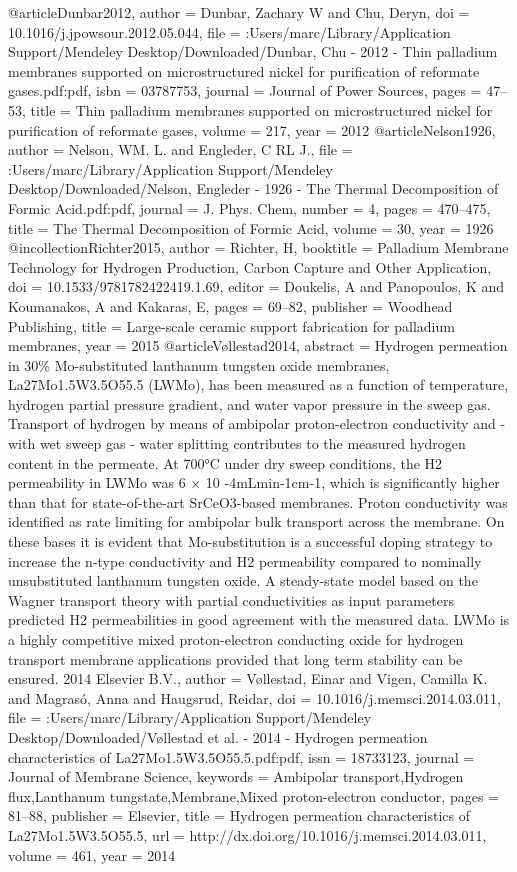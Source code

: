 @article{Dunbar2012,
author = {Dunbar, Zachary W and Chu, Deryn},
doi = {10.1016/j.jpowsour.2012.05.044},
file = {:Users/marc/Library/Application Support/Mendeley Desktop/Downloaded/Dunbar, Chu - 2012 - Thin palladium membranes supported on microstructured nickel for purification of reformate gases.pdf:pdf},
isbn = {03787753},
journal = {Journal of Power Sources},
pages = {47--53},
title = {{Thin palladium membranes supported on microstructured nickel for purification of reformate gases}},
volume = {217},
year = {2012}
}
@article{Nelson1926,
author = {Nelson, WM. L. and Engleder, C RL J.},
file = {:Users/marc/Library/Application Support/Mendeley Desktop/Downloaded/Nelson, Engleder - 1926 - The Thermal Decomposition of Formic Acid.pdf:pdf},
journal = {J. Phys. Chem},
number = {4},
pages = {470--475},
title = {{The Thermal Decomposition of Formic Acid}},
volume = {30},
year = {1926}
}
@incollection{Richter2015,
author = {Richter, H},
booktitle = {Palladium Membrane Technology for Hydrogen Production, Carbon Capture and Other Application},
doi = {10.1533/9781782422419.1.69},
editor = {Doukelis, A and Panopoulos, K and Koumanakos, A and Kakaras, E},
pages = {69--82},
publisher = {Woodhead Publishing},
title = {{Large-scale ceramic support fabrication for palladium membranes}},
year = {2015}
}
@article{Vøllestad2014,
abstract = {Hydrogen permeation in 30{\%} Mo-substituted lanthanum tungsten oxide membranes, La27Mo1.5W3.5O55.5 (LWMo), has been measured as a function of temperature, hydrogen partial pressure gradient, and water vapor pressure in the sweep gas. Transport of hydrogen by means of ambipolar proton-electron conductivity and - with wet sweep gas - water splitting contributes to the measured hydrogen content in the permeate. At 700°C under dry sweep conditions, the H2 permeability in LWMo was 6 × 10 -4mLmin-1cm-1, which is significantly higher than that for state-of-the-art SrCeO3-based membranes. Proton conductivity was identified as rate limiting for ambipolar bulk transport across the membrane. On these bases it is evident that Mo-substitution is a successful doping strategy to increase the n-type conductivity and H2 permeability compared to nominally unsubstituted lanthanum tungsten oxide. A steady-state model based on the Wagner transport theory with partial conductivities as input parameters predicted H2 permeabilities in good agreement with the measured data. LWMo is a highly competitive mixed proton-electron conducting oxide for hydrogen transport membrane applications provided that long term stability can be ensured. {\textcopyright} 2014 Elsevier B.V.},
author = {V{\o}llestad, Einar and Vigen, Camilla K. and Magras{\'{o}}, Anna and Haugsrud, Reidar},
doi = {10.1016/j.memsci.2014.03.011},
file = {:Users/marc/Library/Application Support/Mendeley Desktop/Downloaded/V{\o}llestad et al. - 2014 - Hydrogen permeation characteristics of La27Mo1.5W3.5O55.5.pdf:pdf},
issn = {18733123},
journal = {Journal of Membrane Science},
keywords = {Ambipolar transport,Hydrogen flux,Lanthanum tungstate,Membrane,Mixed proton-electron conductor},
pages = {81--88},
publisher = {Elsevier},
title = {{Hydrogen permeation characteristics of La27Mo1.5W3.5O55.5}},
url = {http://dx.doi.org/10.1016/j.memsci.2014.03.011},
volume = {461},
year = {2014}
}
